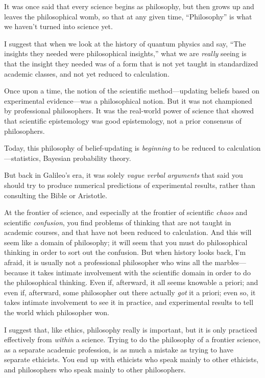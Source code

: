 {
 It was once said that every science begins as philosophy, but then
grows up and leaves the philosophical womb, so that at any given time,
``Philosophy'' is what we
haven't turned into science yet.}

{
 I suggest that when we look at the history of quantum physics and
say, ``The insights they needed were philosophical
insights,'' what we are \textit{really} seeing is
that the insight they needed was of a form that is not yet taught in
standardized academic classes, and not yet reduced to calculation.}

{
 Once upon a time, the notion of the scientific method---updating
beliefs based on experimental evidence---was a philosophical notion.
But it was not championed by professional philosophers. It was the
real-world power of science that showed that scientific epistemology
was good epistemology, not a prior consensus of philosophers.}

{
 Today, this philosophy of belief-updating is \textit{beginning} to
be reduced to calculation---statistics, Bayesian probability theory.}

{
 But back in Galileo's era, it was solely
\textit{vague verbal arguments} that said you should try to produce
numerical predictions of experimental results, rather than consulting
the Bible or Aristotle.}

{
 At the frontier of science, and especially at the frontier of
scientific \textit{chaos} and scientific \textit{confusion}, you find
problems of thinking that are not taught in academic courses, and that
have not been reduced to calculation. And this will seem like a domain
of philosophy; it will seem that you must do philosophical thinking in
order to sort out the confusion. But when history looks back,
I'm afraid, it is usually not a professional
philosopher who wins all the marbles---because it takes intimate
involvement with the scientific domain in order to do the philosophical
thinking. Even if, afterward, it all seems knowable a priori; and even
if, afterward, some philosopher out there actually \textit{got} it a
priori; even so, it takes intimate involvement to see it in practice,
and experimental results to tell the world which philosopher won.}

{
 I suggest that, like ethics, philosophy really is important, but
it is only practiced effectively from \textit{within} a science. Trying
to do the philosophy of a frontier science, as a separate academic
profession, is as much a mistake as trying to have separate ethicists.
You end up with ethicists who speak mainly to other ethicists, and
philosophers who speak mainly to other philosophers.}

